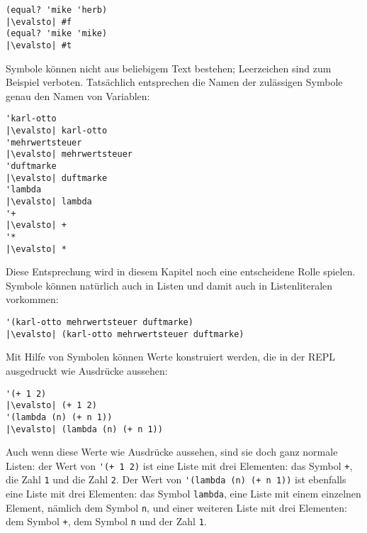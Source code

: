 \begin{lstlisting}
(equal? 'mike 'herb)
|\evalsto| #f
(equal? 'mike 'mike)
|\evalsto| #t
\end{lstlisting}
%
Symbole können nicht aus beliebigem Text bestehen;  
Leerzeichen sind zum Beispiel verboten.  Tatsächlich entsprechen die
Namen der zulässigen Symbole genau den Namen von Variablen:
%
\begin{lstlisting}
'karl-otto
|\evalsto| karl-otto
'mehrwertsteuer
|\evalsto| mehrwertsteuer
'duftmarke
|\evalsto| duftmarke
'lambda
|\evalsto| lambda
'+
|\evalsto| +
'*
|\evalsto| *
\end{lstlisting}
%
Diese Entsprechung wird in diesem Kapitel noch eine entscheidene Rolle
spielen.  Symbole können natürlich auch in Listen und damit auch in
Listenliteralen vorkommen:
%
\begin{lstlisting}
'(karl-otto mehrwertsteuer duftmarke)
|\evalsto| (karl-otto mehrwertsteuer duftmarke)
\end{lstlisting}
%
Mit Hilfe von Symbolen können Werte konstruiert werden, die in der REPL
ausgedruckt wie Ausdrücke aussehen:
%
\begin{lstlisting}
'(+ 1 2)
|\evalsto| (+ 1 2)
'(lambda (n) (+ n 1))
|\evalsto| (lambda (n) (+ n 1))
\end{lstlisting}
%
Auch wenn diese Werte wie Ausdrücke aussehen, sind sie doch ganz
normale Listen: der Wert von \verb|'(+ 1 2)| ist eine Liste mit drei
Elementen: das Symbol \verb|+|, die Zahl \lstinline{1} und die Zahl
\lstinline{2}.  Der Wert von \verb|'(lambda (n) (+ n 1))| ist ebenfalls
eine Liste mit drei Elementen: das Symbol \verb|lambda|, eine Liste
mit einem einzelnen Element, nämlich dem Symbol \lstinline{n}, und einer
weiteren Liste mit drei Elementen: dem Symbol \lstinline{+}, dem Symbol
\lstinline{n} und der Zahl \lstinline{1}.

